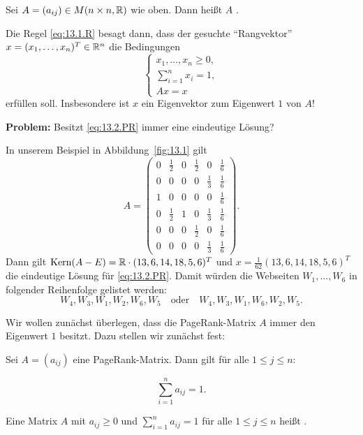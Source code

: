 \begin{definition}
	\label{def:13.2}
	Sei $A = (a_{ij}) \in M(n \times n, \mathbb{R})$ wie oben.
	Dann heißt $A$ .
\end{definition}

Die Regel \eqref{eq:13.1.R} besagt dann, dass der gesuchte \enquote{Rangvektor} $x = (x_1,\dots,x_n)^T \in \mathbb{R}^n$ die Bedingungen
\begin{equation}
	\begin{cases}
		x_1,\dots,x_n \geq 0, \\
		\sum_{i=1}^{n} x_i = 1, \\
		Ax = x
	\end{cases} \label{eq:13.2.PR}
\end{equation}
erfüllen soll.
Insbesondere ist $x$ ein Eigenvektor zum Eigenwert $1$ von $A$!

\textbf{Problem:} Besitzt \eqref{eq:13.2.PR} immer eine eindeutige Lösung?

\begin{beispiel}
	\label{bsp:13.3}
	In unserem Beispiel in Abbildung~\ref{fig:13.1} gilt
	\[
		A = \begin{pmatrix}
			0 & \frac{1}{2} & 0 & \frac{1}{2} & 0           & \frac{1}{6} \\
			0 & 0           & 0 & 0           & \frac{1}{3} & \frac{1}{6} \\
			1 & 0           & 0 & 0           & 0           & \frac{1}{6} \\
			0 & \frac{1}{2} & 1 & 0           & \frac{1}{3} & \frac{1}{6} \\
			0 & 0           & 0 & \frac{1}{2} & 0           & \frac{1}{6} \\
			0 & 0           & 0 & 0           & \frac{1}{3} & \frac{1}{6}
		\end{pmatrix}. 
	\]
	Dann gilt $\operatorname{Kern}(A - E) = \mathbb{R} \cdot (13,6,14,18,5,6)^T$ und $x = \frac{1}{62} (13,6,14,18,5,6)^T$ die eindeutige Lösung für \eqref{eq:13.2.PR}.
	Damit würden die Webseiten $W_1,\dots,W_6$ in folgender Reihenfolge gelistet werden:
	\[
		W_4, W_3, W_1, W_2, W_6, W_5 \quad \text{oder} \quad W_4, W_3, W_1, W_6, W_2, W_5.
	\]
\end{beispiel}

Wir wollen zunächst überlegen, dass die PageRank-Matrix $A$ immer den Eigenwert $1$ besitzt.
Dazu stellen wir zunächst fest:
	
\begin{lemma}
	\label{lemma:13.4}
	Sei $A = (a_{ij})$ eine PageRank-Matrix.
	Dann gilt für alle $1 \leq j \leq n$:
	
	\[
		\sum_{i=1}^n a_{ij} = 1.
	\]
	
	Eine Matrix $A$ mit $a_{ij} \geq 0$ und $\sum_{i=1}^{n} a_{ij} = 1$ für alle $1 \leq j \leq n$ heißt .
\end{lemma}

